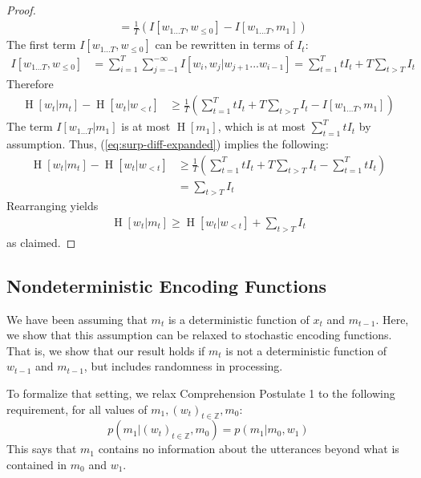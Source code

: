 \documentclass[11pt,letterpaper]{article}
\begin{document}
\begin{proof}
\begin{align}
& = \frac{1}{T} \left(I[w_{1\dots T}, w_{\leq 0}] - I[w_{1\dots T}, m_1]\right) 
\end{align}
The first term $I[w_{1\dots T}, w_{\leq 0}]$ can be rewritten in terms of $I_t$:
\begin{align}\label{eq:i-expanded}
I[w_{1\dots T}, w_{\leq 0}] &= \sum_{i=1}^T \sum_{j=-1}^{-\infty} I[w_i, w_j | w_{j+1}...w_{i-1}] = \sum_{t=1}^T t I_t + T \sum_{t > T} I_t
\end{align}
Therefore
\begin{align}\label{eq:surp-diff-expanded}
\operatorname{H}[w_t | m_t] - \operatorname{H}[w_t | w_{<t}]& \geq \frac{1}{T} \left(\sum_{t=1}^T t I_t + T \sum_{t > T} I_t - I[w_{1\dots T}, m_1]\right) 
\end{align}
The term $I[w_{1\dots T}|m_1]$ is at most $\operatorname{H}[m_1]$, which is at most $\sum_{t=1}^T t I_t$ by assumption. Thus,  (\ref{eq:surp-diff-expanded}) implies the following:
\begin{align*}
\operatorname{H}[w_t | m_t] - \operatorname{H}[w_t | w_{<t}]& \geq \frac{1}{T} \left(\sum_{t=1}^T t I_t + T \sum_{t > T} I_t - \sum_{t=1}^T t I_t\right) \\
&= \sum_{t > T} I_t
\end{align*}
Rearranging yields
\begin{align}
\operatorname{H}[w_t|m_t] \geq \operatorname{H}[w_t | w_{<t}] + \sum_{t > T} I_t
\end{align}
as claimed.
\end{proof}





\subsection{Nondeterministic Encoding Functions}

We have been assuming that $m_t$ is a deterministic function of $x_t$ and $m_{t-1}$.
Here, we show that this assumption can be relaxed to stochastic encoding functions.
That is, we show that our result holds if
$m_t$ is not a deterministic function of $w_{t-1}$ and $m_{t-1}$, but includes randomness in processing.

To formalize that setting, we relax Comprehension Postulate 1 to the following requirement, for all values of $m_1, (w_{t})_{t \in \mathbb{Z}}, m_0$:
\begin{equation}\label{eq:listener-markov-nondeterministic}
p(m_1| (w_{t})_{t \in \mathbb{Z}}, m_0)   = p(m_1 | m_0, w_1)
\end{equation}
This says that $m_1$ contains no information about the utterances beyond what is contained in $m_0$ and $w_1$.	
\end{document}
